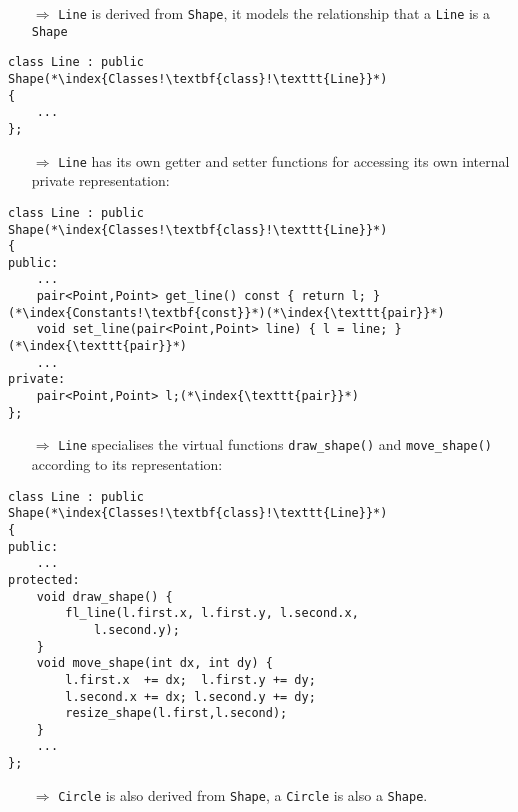 \documentclass[10pt]{book}
\begin{document}
\begin{enumerate}
\item[$\Rightarrow$] \texttt{Line} is derived from \texttt{Shape}, it models the relationship that a \texttt{Line} is a \texttt{Shape}
\end{enumerate}
\begin{lstlisting}
class Line : public Shape(*\index{Classes!\textbf{class}!\texttt{Line}}*)
{
    ...
};
\end{lstlisting}
\begin{enumerate}
\item[$\Rightarrow$] \texttt{Line} has its own getter and setter functions for accessing its own internal private representation:
\end{enumerate}
\begin{lstlisting}
class Line : public Shape(*\index{Classes!\textbf{class}!\texttt{Line}}*)
{
public:
    ...
    pair<Point,Point> get_line() const { return l; }(*\index{Constants!\textbf{const}}*)(*\index{\texttt{pair}}*)
    void set_line(pair<Point,Point> line) { l = line; }(*\index{\texttt{pair}}*)
    ...
private:
    pair<Point,Point> l;(*\index{\texttt{pair}}*)
};
\end{lstlisting}
\begin{enumerate}
\item[$\Rightarrow$] \texttt{Line} specialises the virtual functions \texttt{draw\_shape()} and \texttt{move\_shape()} according to its representation:
\end{enumerate}
\begin{lstlisting}
class Line : public Shape(*\index{Classes!\textbf{class}!\texttt{Line}}*)
{
public:
    ...
protected:
    void draw_shape() {
        fl_line(l.first.x, l.first.y, l.second.x,
            l.second.y);
    }
    void move_shape(int dx, int dy) {
        l.first.x  += dx;  l.first.y += dy;
        l.second.x += dx; l.second.y += dy;
        resize_shape(l.first,l.second);
    }
    ...
};
\end{lstlisting}
\begin{enumerate}
\item[$\Rightarrow$] \texttt{Circle} is also derived from \texttt{Shape}, a \texttt{Circle} is also a \texttt{Shape}.
\end{enumerate}
\end{document}
